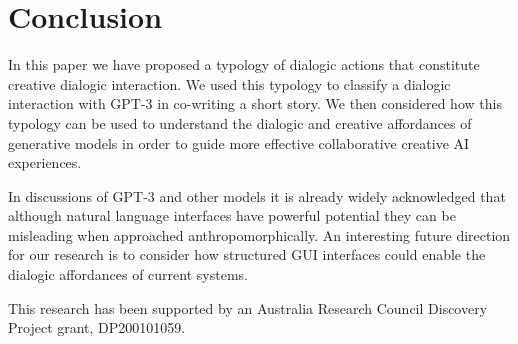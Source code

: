 \documentclass[acmlarge, nonacm, screen]{acmart} %
\begin{document}
\section{Conclusion}

In this paper we have proposed a typology of dialogic actions that constitute creative dialogic interaction. We used this typology to classify a dialogic interaction with GPT-3 in co-writing a short story. We then considered how this typology can be used to understand the dialogic and creative affordances of generative models in order to guide more effective collaborative creative AI experiences.

In discussions of GPT-3 and other models it is already widely acknowledged that although natural language interfaces have powerful potential they can be misleading when approached anthropomorphically. An interesting future direction for our research is to consider how structured GUI interfaces could enable the dialogic affordances of current systems. 


\begin{acks}
This research has been supported by an Australia Research Council Discovery Project grant, DP200101059.
\end{acks}



\end{document}
